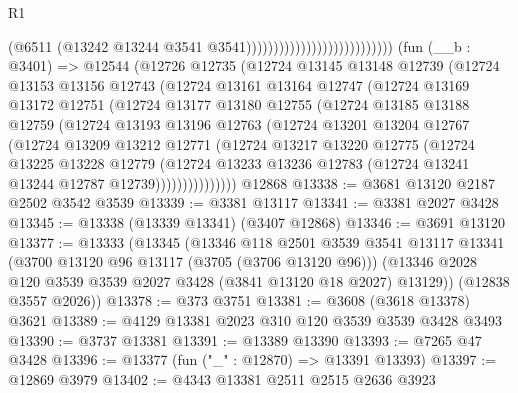 \begin{lexlean}{R1}
\begin{coremodule}
                                                      (@6511
                                                        (@13242
                                                          @13244
                                                          @3541
                                                          @3541)))))))))))))))))))))))))))
    (fun (__b : @3401) =>
    @12544
      (@12726
        @12735
        (@12724
          @13145
          @13148
          @12739
          (@12724
            @13153
            @13156
            @12743
            (@12724
              @13161
              @13164
              @12747
              (@12724
                @13169
                @13172
                @12751
                (@12724
                  @13177
                  @13180
                  @12755
                  (@12724
                    @13185
                    @13188
                    @12759
                    (@12724
                      @13193
                      @13196
                      @12763
                      (@12724
                        @13201
                        @13204
                        @12767
                        (@12724
                          @13209
                          @13212
                          @12771
                          (@12724
                            @13217
                            @13220
                            @12775
                            (@12724
                              @13225
                              @13228
                              @12779
                              (@12724
                                @13233
                                @13236
                                @12783
                                (@12724 @13241 @13244 @12787 @12739)))))))))))))))
    @12868
@13338 := @3681 @13120 @2187 @2502 @3542 @3539
@13339 := @3381 @13117
@13341 := @3381 @2027 @3428
@13345 := @13338 (@13339 @13341) (@3407 @12868)
@13346 := @3691 @13120
@13377 := @13333
    (@13345
      (@13346
        @118
        @2501
        @3539
        @3541
        @13117
        @13341
        (@3700 @13120 @96 @13117 (@3705 (@3706 @13120 @96)))
        (@13346 @2028 @120 @3539 @3539 @2027 @3428 (@3841 @13120 @18 @2027) @13129))
      (@12838 @3557 @2026))
@13378 := @373 @3751
@13381 := @3608 (@3618 @13378) @3621
@13389 := @4129 @13381 @2023 @310 @120 @3539 @3539 @3428 @3493
@13390 := @3737 @13381
@13391 := @13389 @13390
@13393 := @7265 @47 @3428
@13396 := @13377 (fun ("_" : @12870) => @13391 @13393)
@13397 := @12869 @3979
@13402 := @4343 @13381 @2511 @2515 @2636 @3923

\end{coremodule}
\end{lexlean}
